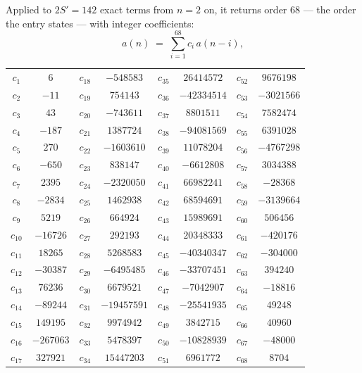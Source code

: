 \documentclass[11pt,a4paper]{article}
\theoremstyle{plain}
\theoremstyle{definition}
\begin{document}
Applied to $2S'=142$ exact terms from $n=2$ on, it returns order $68$ --- the
order the entry states --- with integer coefficients:
\[
a(n)\;=\;\sum_{i=1}^{68}c_i\,a(n-i),
\]
\begin{center}\small
\begin{tabular}{cccccccc}
$c_{1}$ & $6$ & $c_{18}$ & $-548583$ & $c_{35}$ & $26414572$ & $c_{52}$ & $9676198$ \\
$c_{2}$ & $-11$ & $c_{19}$ & $754143$ & $c_{36}$ & $-42334514$ & $c_{53}$ & $-3021566$ \\
$c_{3}$ & $43$ & $c_{20}$ & $-743611$ & $c_{37}$ & $8801511$ & $c_{54}$ & $7582474$ \\
$c_{4}$ & $-187$ & $c_{21}$ & $1387724$ & $c_{38}$ & $-94081569$ & $c_{55}$ & $6391028$ \\
$c_{5}$ & $270$ & $c_{22}$ & $-1603610$ & $c_{39}$ & $11078204$ & $c_{56}$ & $-4767298$ \\
$c_{6}$ & $-650$ & $c_{23}$ & $838147$ & $c_{40}$ & $-6612808$ & $c_{57}$ & $3034388$ \\
$c_{7}$ & $2395$ & $c_{24}$ & $-2320050$ & $c_{41}$ & $66982241$ & $c_{58}$ & $-28368$ \\
$c_{8}$ & $-2834$ & $c_{25}$ & $1462938$ & $c_{42}$ & $68594691$ & $c_{59}$ & $-3139664$ \\
$c_{9}$ & $5219$ & $c_{26}$ & $664924$ & $c_{43}$ & $15989691$ & $c_{60}$ & $506456$ \\
$c_{10}$ & $-16726$ & $c_{27}$ & $292193$ & $c_{44}$ & $20348333$ & $c_{61}$ & $-420176$ \\
$c_{11}$ & $18265$ & $c_{28}$ & $5268583$ & $c_{45}$ & $-40340347$ & $c_{62}$ & $-304000$ \\
$c_{12}$ & $-30387$ & $c_{29}$ & $-6495485$ & $c_{46}$ & $-33707451$ & $c_{63}$ & $394240$ \\
$c_{13}$ & $76236$ & $c_{30}$ & $6679521$ & $c_{47}$ & $-7042907$ & $c_{64}$ & $-18816$ \\
$c_{14}$ & $-89244$ & $c_{31}$ & $-19457591$ & $c_{48}$ & $-25541935$ & $c_{65}$ & $49248$ \\
$c_{15}$ & $149195$ & $c_{32}$ & $9974942$ & $c_{49}$ & $3842715$ & $c_{66}$ & $40960$ \\
$c_{16}$ & $-267063$ & $c_{33}$ & $5478397$ & $c_{50}$ & $-10828939$ & $c_{67}$ & $-48000$ \\
$c_{17}$ & $327921$ & $c_{34}$ & $15447203$ & $c_{51}$ & $6961772$ & $c_{68}$ & $8704$ \\
\end{tabular}
\end{center}
\end{document}
